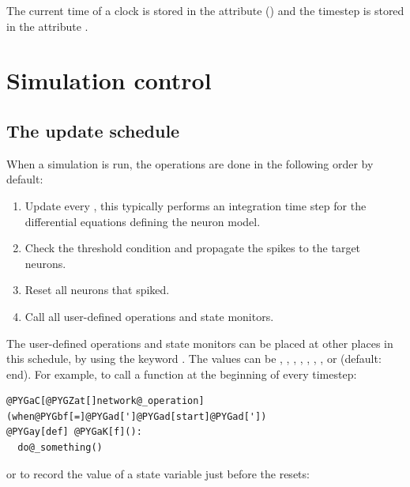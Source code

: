 \documentclass[letterpaper,10pt,english]{manual}
\begin{document}
The current time of a clock is stored in the attribute  () and
the timestep is stored in the attribute .

\resetcurrentobjects
\hypertarget{--doc-simulation}{}

\hypertarget{index-150}{}\section{Simulation control}

\hypertarget{index-151}{}\subsection{The update schedule}

When a simulation is run, the operations are done in the following order by default:
\begin{enumerate}
\item {} 
Update every \hyperlink{brian.NeuronGroup}{}, this typically performs an integration time step for the differential equations defining the neuron model.

\item {} 
Check the threshold condition and propagate the spikes to the target neurons.

\item {} 
Reset all neurons that spiked.

\item {} 
Call all user-defined operations and state monitors.

\end{enumerate}

The user-defined operations and state monitors can be placed at other places in this schedule, by
using the keyword . The values can be , , ,
, , , ,  or
 (default: end). For example, to call a function  at the beginning of every timestep:

\begin{Verbatim}[commandchars=@\[\]]
@PYGaC[@PYGZat[]network@_operation](when@PYGbf[=]@PYGad[']@PYGad[start]@PYGad['])
@PYGay[def] @PYGaK[f]():
  do@_something()
\end{Verbatim}

or to record the value of a state variable just before the resets:
\end{document}
